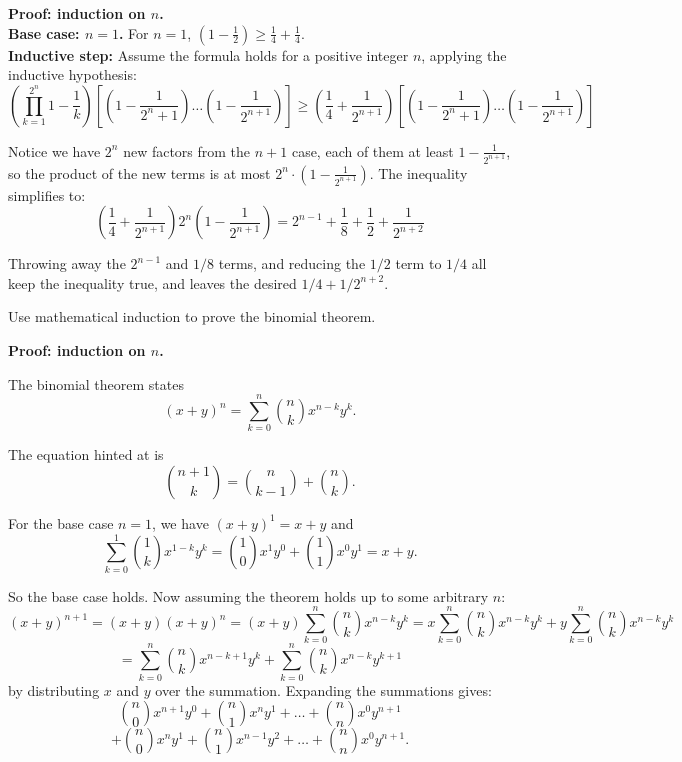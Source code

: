 \documentclass{article}
\begin{document}
\textbf{Proof: induction on $n$.}
\\

\textbf{Base case: $n = 1$.} For $n = 1$, $\left(1 - \frac{1}{2}\right) \geq \frac{1}{4} + \frac{1}{4}$.
\\

\textbf{Inductive step:} Assume the formula holds for a positive integer $n$, applying the inductive hypothesis:
$$\left(\prod_{k=1}^{2^n}1-\frac{1}{k}\right)\left[\left(1 - \frac{1}{2^{n} + 1}\right) \ldots \left(1 - \frac{1}{2^{n+1}}\right)\right] \geq \left(\frac{1}{4} + \frac{1}{2^{n+1}}\right)\left[\left(1 - \frac{1}{2^{n} + 1}\right) \ldots \left(1 - \frac{1}{2^{n+1}}\right)\right] $$

Notice we have $2^n$ new factors from the $n+1$ case, each of them at least $1 - \frac{1}{2^{n+1}}$, so the product of the new terms is at most $2^n \cdot \left(1 - \frac{1}{2^{n+1}}\right)$. The inequality simplifies to:
$$\left(\frac{1}{4} + \frac{1}{2^{n+1}}\right)2^n\left(1 - \frac{1}{2^{n+1}}\right) = 2^{n-1} + \frac{1}{8} + \frac{1}{2} + \frac{1}{2^{n+2}}$$

Throwing away the $2^{n-1}$ and $1/8$ terms, and reducing the $1/2$ term to $1/4$ all keep the inequality true, and leaves the desired $1/4 + 1/2^{n+2}$.

\begin{problem}
Use mathematical induction to prove the binomial theorem.
\end{problem}

\textbf{Proof: induction on $n$.}

The binomial theorem states
$$(x + y)^n = \sum_{k=0}^{n} \binom{n}{k}x^{n-k}y^k.$$

The equation hinted at is
$$\binom{n+1}{k} = \binom{n}{k-1} + \binom{n}{k}.$$

For the base case $n = 1$, we have $(x + y)^1 = x + y$ and
$$\sum_{k=0}^1 \binom{1}{k} x^{1-k}y^k = \binom{1}{0}x^1 y^0 + \binom{1}{1}x^0 y^1 = x + y.$$

So the base case holds. Now assuming the theorem holds up to some arbitrary $n$:
$$(x + y)^{n+1} = (x + y)(x + y)^n = (x + y)\sum_{k=0}^{n} \binom{n}{k}x^{n-k}y^k = x\sum_{k=0}^{n} \binom{n}{k}x^{n-k}y^k + y\sum_{k=0}^{n} \binom{n}{k}x^{n-k}y^k$$
$$=\sum_{k=0}^{n} \binom{n}{k}x^{n-k+1}y^{k} + \sum_{k=0}^{n} \binom{n}{k}x^{n-k}y^{k+1}$$
by distributing $x$ and $y$ over the summation. Expanding the summations gives:
$$\binom{n}{0}x^{n+1}y^0 + \binom{n}{1}x^n y^1 + \ldots + \binom{n}{n}x^0 y^{n+1}$$
$$ + \binom{n}{0}x^n y^1 + \binom{n}{1}x^{n-1}y^2 + \ldots + \binom{n}{n}x^0 y^{n+1}.$$
\end{document}
